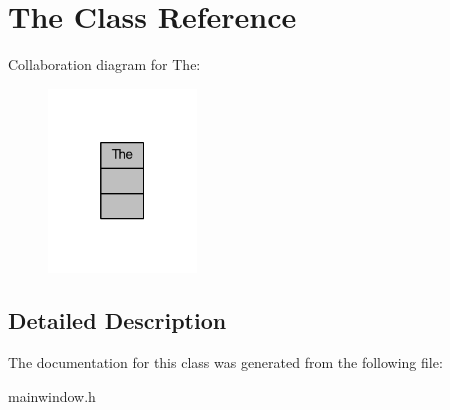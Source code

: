 \hypertarget{class_the}{}\section{The Class Reference}
\label{class_the}


Collaboration diagram for The\+:\nopagebreak
\begin{figure}[H]
\begin{center}
\leavevmode
\includegraphics[width=112pt]{class_the__coll__graph}
\end{center}
\end{figure}


\subsection{Detailed Description}

\begin{DoxyItemize}
\item 
\end{DoxyItemize}

The documentation for this class was generated from the following file\+:\begin{DoxyCompactItemize}
\item 
mainwindow.\+h\end{DoxyCompactItemize}
